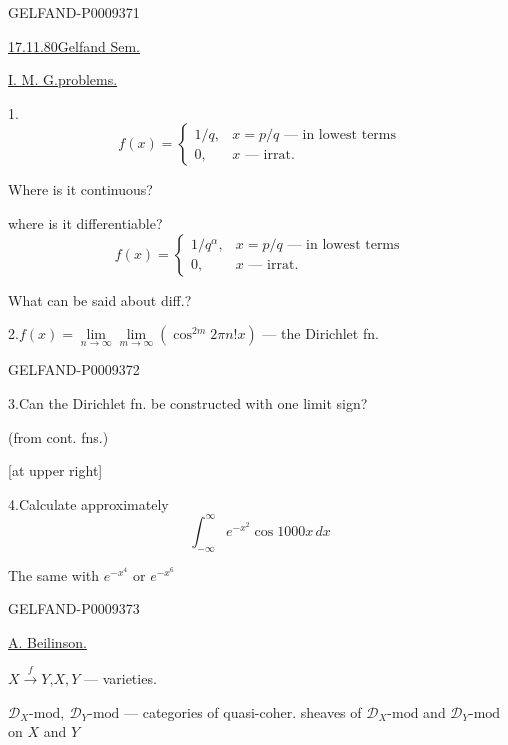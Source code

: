 \begin{GelfandAdjacentEvidence}{GELFAND-P000937}{1}

\underline{\underline{17.11.80}}\qquad\underline{Gelfand Sem.}

\underline{I. M. G.}\qquad\underline{problems.}

1.\quad
\[
 f(x)=\left\{\begin{array}{ll}
 1/q,&x=p/q\text{ --- in lowest terms}\\
 0,&x\text{ --- irrat.}
 \end{array}\right.
\]

Where is it continuous?

where is it differentiable?
\[
 f(x)=\left\{\begin{array}{ll}
 1/q^\alpha,&x=p/q\text{ --- in lowest terms}\\
 0,&x\text{ --- irrat.}
 \end{array}\right.
\]

What can be said about diff.?

2.\quad $f(x)=\lim\limits_{n\to\infty}\lim\limits_{m\to\infty}(\cos^{2m}2\pi n!x)$ --- the Dirichlet fn.
\end{GelfandAdjacentEvidence}
\begin{GelfandAdjacentEvidence}{GELFAND-P000937}{2}


3.\quad Can the Dirichlet fn. be constructed with one limit sign?

(from cont. fns.)

[at upper right]

4.\quad Calculate approximately
\[
 \int_{-\infty}^{\infty}e^{-x^2}\cos1000x\,dx
\]

The same with $e^{-x^4}$ or $e^{-x^6}$
\end{GelfandAdjacentEvidence}
\begin{GelfandAdjacentEvidence}{GELFAND-P000937}{3}


\underline{A. Beilinson.}

$X\overset f\longrightarrow Y$,\qquad $X,Y$ --- varieties.

$\mathcal D_X\text{-mod},\ \mathcal D_Y\text{-mod}$ --- categories of quasi-coher. sheaves of
$\mathcal D_X\text{-mod}$ and $\mathcal D_Y\text{-mod}$ on $X$ and $Y$
\end{GelfandAdjacentEvidence}
